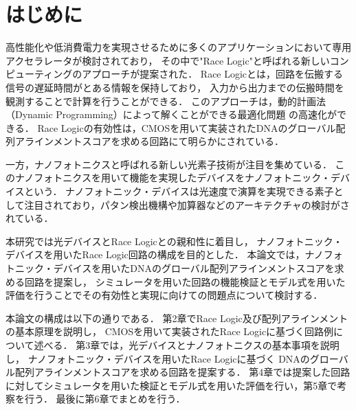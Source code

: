 \chapter{はじめに}
高性能化や低消費電力を実現させるために多くのアプリケーションにおいて専用アクセラレータが検討されており，
その中で"Race Logic"と呼ばれる新しいコンピューティングのアプローチが提案された\cite{madhavan2014race}．
Race Logicとは，回路を伝搬する信号の遅延時間がとある情報を保持しており，
入力から出力までの伝搬時間を観測することで計算を行うことができる．
このアプローチは，動的計画法（Dynamic Programming）によって解くことができる最適化問題
の高速化ができる．
Race Logicの有効性は，CMOSを用いて実装されたDNAのグローバル配列アラインメントスコアを求める回路にて明らかにされている．

一方，ナノフォトニクスと呼ばれる新しい光素子技術が注目を集めている．
このナノフォトニクスを用いて機能を実現したデバイスをナノフォトニック・デバイスという．
ナノフォトニック・デバイスは光速度で演算を実現できる素子として注目されており，パタン検出機構や加算器などのアーキテクチャの検討がされている．

本研究では光デバイスとRace Logicとの親和性に着目し，
ナノフォトニック・デバイスを用いたRace Logic回路の構成を目的とした．
本論文では，ナノフォトニック・デバイスを用いたDNAのグローバル配列アラインメントスコアを求める回路を提案し，
シミュレータを用いた回路の機能検証とモデル式を用いた評価を行うことでその有効性と実現に向けての問題点について検討する．

本論文の構成は以下の通りである．
第2章でRace Logic及び配列アラインメントの基本原理を説明し，
CMOSを用いて実装されたRace Logicに基づく回路例について述べる．
第3章では，光デバイスとナノフォトニクスの基本事項を説明し，
ナノフォトニック・デバイスを用いたRace Logicに基づく
DNAのグローバル配列アラインメントスコアを求める回路を提案する．
第4章では提案した回路に対してシミュレータを用いた検証とモデル式を用いた評価を行い，第5章で考察を行う．
最後に第6章でまとめを行う．

